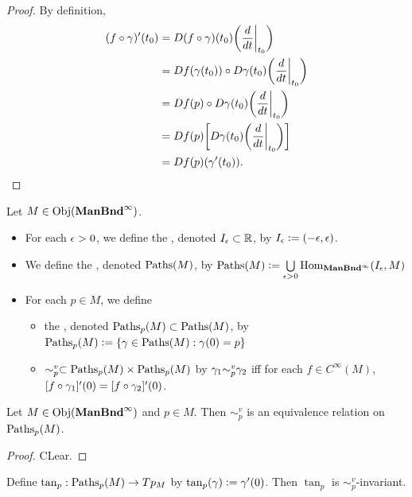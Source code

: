 \documentclass{book}
\begin{document}
	\begin{proof}
		By definition,
		\begin{align*}
			(f \circ \gamma)'(t_0)
			& = D(f \circ \gamma)(t_0) \bigg(\frac{d}{dt}\bigg|_{t_0}\bigg) \\
			& = Df(\gamma(t_0)) \circ D\gamma(t_0) \bigg(\frac{d}{dt}\bigg|_{t_0}\bigg) \\
			& = Df(p) \circ D \gamma (t_0) \bigg(\frac{d}{dt}\bigg|_{t_0}\bigg) \\
			& = Df(p) \bigg[ D \gamma (t_0) \bigg(\frac{d}{dt}\bigg|_{t_0}\bigg) \bigg] \\
			& = Df(p) (\gamma'(t_0)). 
		\end{align*}
	\end{proof}
	
	\begin{defn}
		Let $M \in \operatorname{Obj}(\operatorname*{\text{\textbf{ManBnd}}^{\infty}})$. 
		\begin{itemize}
			\item For each $\epsilon > 0$, we define the , denoted $I_{\epsilon} \subset \mathbb{R}$, by $I_{\epsilon} \vcentcolon= (-\epsilon, \epsilon)$. 
			\item We define the , denoted $\text{Paths}(M)$, by $\text{Paths}(M) \vcentcolon= \bigcup\limits_{\epsilon > 0} \operatorname{Hom}_{\operatorname*{\text{\textbf{ManBnd}}^{\infty}}}(I_{\epsilon}, M)$
			\item For each $p \in M$, we define 
			\begin{itemize}
				\item the , denoted $\text{Paths}_p(M) \subset \text{Paths}(M)$, by $\text{Paths}_p(M) \vcentcolon= \{\gamma \in \text{Paths}(M): \gamma(0) = p \}$
				\item $\sim_p^v \subset \text{Paths}_p(M) \times \text{Paths}_p(M)$ by $\gamma_1 {\sim_p^v} \gamma_2$ iff for each $f \in C^{\infty}(M)$, $[f \circ \gamma_1]'(0) = [f \circ \gamma_2]'(0)$.
			\end{itemize}
		\end{itemize} 
	\end{defn}
	
	\begin{ex}
		Let $M \in \operatorname{Obj}(\operatorname*{\text{\textbf{ManBnd}}^{\infty}})$ and $p \in M$. Then $\sim_p^v$ is an equivalence relation on $\text{Paths}_p(M)$.  
	\end{ex}
	
	\begin{proof}
		CLear. 
	\end{proof}
	
	\begin{ex}
		Define $\tan_p:\text{Paths}_p(M) \rightarrow Tp_M$ by $\tan_p(\gamma) \vcentcolon= \gamma'(0)$. Then $\tan_p$ is $\sim_p^v$-invariant.  
	\end{ex}
	
\end{document}
